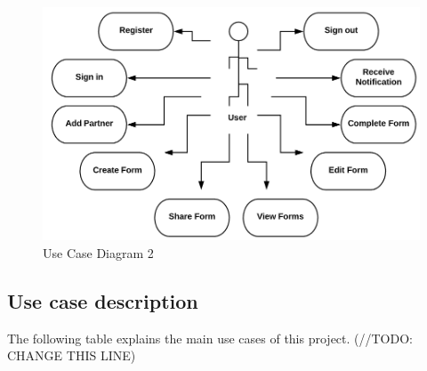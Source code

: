 \begin{figure}[]
    \center
    \includegraphics{../figures/UseCaseUser}
    \caption{Use Case Diagram 2}
\end{figure}

\subsection{Use case description}

The following table explains the main use cases of this project. (//TODO: CHANGE THIS LINE)

